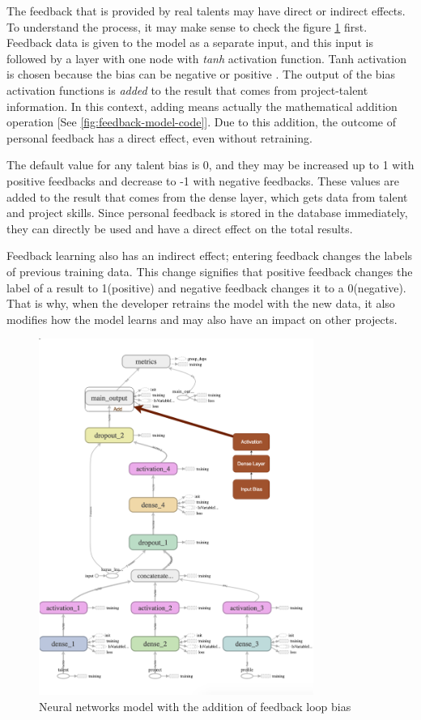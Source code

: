 The feedback that is provided by real talents may have direct or indirect effects. To understand the process, it may make sense to check the figure \ref{fig:tensorboard-feedback} first. Feedback data is given to the model as a separate input, and this input is followed by a layer with one node with \textit{tanh} activation function. Tanh activation is chosen because the bias can be negative or positive \cite{pedamonti2018comparison}. The output of the bias activation functions is \textit{added} to the result that comes from project-talent information. In this context, adding means actually the mathematical addition operation [See \ref{fig:feedback-model-code}]. Due to this addition, the outcome of personal feedback has a direct effect, even without retraining. 

The default value for any talent bias is 0, and they may be increased up to 1 with positive feedbacks and decrease to -1 with negative feedbacks. These values are added to the result that comes from the dense layer, which gets data from talent and project skills. Since personal feedback is stored in the database immediately, they can directly be used and have a direct effect on the total results.


Feedback learning also has an indirect effect;  entering feedback changes the labels of previous training data. This change signifies that positive feedback changes the label of a result to 1(positive) and negative feedback changes it to a 0(negative). That is why, when the developer retrains the model with the new data, it also modifies how the model learns and may also have an impact on other projects.


\begin{figure}[htp]
	\centering
	\includegraphics[width=0.8\textwidth]{figures/TensorBoardFeedback.png}
	\caption{Neural networks model with the addition of feedback loop bias}
	\label{fig:tensorboard-feedback}
\end{figure}



